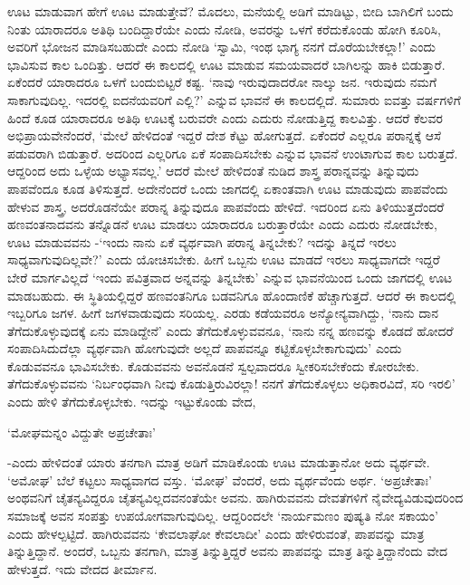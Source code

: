 ಊಟ ಮಾಡುವಾಗ ಹೇಗೆ ಊಟ ಮಾಡುತ್ತೇವೆ? ಮೊದಲು, ಮನೆಯಲ್ಲಿ ಅಡಿಗೆ ಮಾಡಿಟ್ಟು, ಬೀದಿ ಬಾಗಿಲಿಗೆ ಬಂದು ನಿಂತು ಯಾರಾದರೂ ಅತಿಥಿ ಬಂದಿದ್ದಾರೆಯೇ ಎಂದು ನೋಡಿ, ಅವರನ್ನು ಒಳಗೆ ಕರೆದುಕೊಂಡು ಹೋಗಿ ಕೂರಿಸಿ, ಅವರಿಗೆ ಭೋಜನ ಮಾಡಿಸಬಹುದೇ ಎಂದು ನೋಡಿ `ಸ್ವಾಮಿ, ಇಂಥ ಭಾಗ್ಯ ನನಗೆ ದೊರೆಯಬೇಕಲ್ಲಾ!' ಎಂದು ಭಾವಿಸುವ ಕಾಲ ಒಂದಿತ್ತು. ಆದರೆ ಈ ಕಾಲದಲ್ಲಿ ಊಟ ಮಾಡುವ ಸಮಯವಾದರೆ ಬಾಗಿಲನ್ನು ಹಾಕಿ ಬಿಡುತ್ತಾರೆ. ಏಕೆಂದರೆ ಯಾರಾದರೂ ಒಳಗೆ ಬಂದುಬಿಟ್ಟರೆ ಕಷ್ಟ. `ನಾವು ಇರುವುದಾದರೋ ನಾಲ್ಕು ಜನ. ಇರುವುದು ನಮಗೆ ಸಾಕಾಗುವುದಿಲ್ಲ. ಇದರಲ್ಲಿ ಐದನೆಯವರಿಗೆ ಎಲ್ಲಿ?' ಎನ್ನುವ ಭಾವನೆ ಈ ಕಾಲದಲ್ಲಿದೆ. ಸುಮಾರು ಐವತ್ತು ವರ್ಷಗಳಿಗೆ ಹಿಂದೆ ಕೂಡ ಯಾರಾದರೂ ಅತಿಥಿ ಊಟಕ್ಕೆ ಬರುವರೇ ಎಂದು ಎದುರು ನೋಡುತ್ತಿದ್ದ ಕಾಲವಿತ್ತು. ಆದರೆ ಕೆಲವರ ಅಭಿಪ್ರಾಯವೇನೆಂದರೆ, `ಮೇಲೆ ಹೇಳಿದಂತೆ ಇದ್ದರೆ ದೇಶ ಕೆಟ್ಟು ಹೋಗುತ್ತದೆ. ಏಕೆಂದರೆ ಎಲ್ಲರೂ ಪರಾನ್ನಕ್ಕೆ ಆಸೆ ಪಡುವರಾಗಿ ಬಿಡುತ್ತಾರೆ. ಅದರಿಂದ ಎಲ್ಲರಿಗೂ ಏಕೆ ಸಂಪಾದಿಸಬೇಕು ಎನ್ನುವ ಭಾವನೆ ಉಂಟಾಗುವ ಕಾಲ ಬರುತ್ತದೆ. ಆದ್ದರಿಂದ ಅದು ಒಳ್ಳೆಯ ಅಭ್ಯಾಸವಲ್ಲ.' ಆದರೆ ಮೇಲೆ ಹೇಳಿದಂತೆ ನುಡಿದ ಶಾಸ್ತ್ರ ಪರಾನ್ನವನ್ನು ತಿನ್ನುವುದು ಪಾಪವೆಂದೂ ಕೂಡ ತಿಳಿಸುತ್ತದೆ. ಅದೇನೆಂದರೆ ಒಂದು ಜಾಗದಲ್ಲಿ ಏಕಾಂತವಾಗಿ ಊಟ ಮಾಡುವುದು ಪಾಪವೆಂದು ಹೇಳುವ ಶಾಸ್ತ್ರ, ಅದರೊಡನೆಯೇ ಪರಾನ್ನ ತಿನ್ನುವುದೂ ಪಾಪವೆಂದು ಹೇಳಿದೆ. ಇದರಿಂದ ಏನು ತಿಳಿಯುತ್ತದೆಂದರೆ ಹಣವಂತನಾದವನು ತನ್ನೊಡನೆ ಊಟ ಮಾಡಲು ಯಾರಾದರೂ ಬರುತ್ತಾರೆಯೇ ಎಂದು ಎದುರು ನೋಡಬೇಕು, ಊಟ ಮಾಡುವವನು -`ಇಂದು ನಾನು ಏಕೆ ವ್ಯರ್ಥವಾಗಿ ಪರಾನ್ನ ತಿನ್ನಬೇಕು? ಇದನ್ನು ತಿನ್ನದೆ ಇರಲು ಸಾಧ್ಯವಾಗುವುದಿಲ್ಲವೇ?' ಎಂದು ಯೋಚಿಸಬೇಕು. ಹೀಗೆ ಒಬ್ಬನು ಊಟ ಮಾಡದೆ ಇರಲು ಸಾಧ್ಯವಾಗದೇ ಇದ್ದರೆ ಬೇರೆ ಮಾರ್ಗವಿಲ್ಲದೆ `ಇಂದು ಪವಿತ್ರವಾದ ಅನ್ನವನ್ನು ತಿನ್ನಬೇಕು' ಎನ್ನುವ ಭಾವನೆಯಿಂದ ಒಂದು ಜಾಗದಲ್ಲಿ ಊಟ ಮಾಡಬಹುದು. ಈ ಸ್ಥಿತಿಯಲ್ಲಿದ್ದರೆ ಹಣವಂತನಿಗೂ ಬಡವನಿಗೂ ಹೊಂದಾಣಿಕೆ ಹೆಚ್ಚಾಗುತ್ತದೆ. ಆದರೆ ಈ ಕಾಲದಲ್ಲಿ ಇಬ್ಬರಿಗೂ ಜಗಳ. ಹೀಗೆ ಜಗಳವಾಡುವುದು ಸರಿಯಲ್ಲ. ಎರಡು ಕಡೆಯವರೂ ಅನ್ಯೋನ್ಯವಾಗಿದ್ದು, `ನಾನು ದಾನ ತೆಗೆದುಕೊಳ್ಳುವುದಕ್ಕೆ ಏನು ಮಾಡಿದ್ದೇನೆ' ಎಂದು ತೆಗೆದುಕೊಳ್ಳುವವನೂ, `ನಾನು ನನ್ನ ಹಣವನ್ನು ಕೊಡದೆ ಹೋದರೆ ಸಂಪಾದಿಸಿದುದೆಲ್ಲಾ ವ್ಯರ್ಥವಾಗಿ ಹೋಗುವುದೇ ಅಲ್ಲದೆ ಪಾಪವನ್ನೂ ಕಟ್ಟಿಕೊಳ್ಳಬೇಕಾಗುವುದು' ಎಂದು ಕೊಡುವವನೂ ಭಾವಿಸಬೇಕು. ಕೊಡುವವನು ಅವನೊಡನೆ ಸ್ವಲ್ಪವಾದರೂ ಸ್ವೀಕರಿಸಬೇಕೆಂದು ಕೋರಬೇಕು. ತೆಗೆದುಕೊಳ್ಳುವವನು `ನಿರ್ಬಂಧವಾಗಿ ನೀವು ಕೊಡುತ್ತಿರುವಿರಲ್ಲಾ! ನನಗೆ ತೆಗೆದುಕೊಳ್ಳಲು ಅಧಿಕಾರವಿದೆ, ಸರಿ ಇರಲಿ' ಎಂದು ಹೇಳಿ ತೆಗೆದುಕೊಳ್ಳಬೇಕು. ಇದನ್ನು ಇಟ್ಟುಕೊಂಡು ವೇದ,

\begin{shloka}
`ಮೋಘಮನ್ನಂ ವಿದ್ದುತೇ ಅಪ್ರಚೇತಾಃ'
\end{shloka}

-ಎಂದು ಹೇಳಿದಂತೆ ಯಾರು ತನಗಾಗಿ ಮಾತ್ರ ಅಡಿಗೆ ಮಾಡಿಕೊಂಡು ಊಟ ಮಾಡುತ್ತಾನೋ ಅದು ವ್ಯರ್ಥವೇ. `ಅಮೋಘ' ಬೆಲೆ ಕಟ್ಟಲು ಸಾಧ್ಯವಾಗದ ವಸ್ತು. `ಮೋಘ' ವೆಂದರೆ, ಅದು ವ್ಯರ್ಥವೆಂದು ಅರ್ಥ. `ಅಪ್ರಚೇತಾಃ' ಅಂಥವನಿಗೆ ಚೈತನ್ಯವಿದ್ದರೂ ಚೈತನ್ಯವಿಲ್ಲದವನಂತೆಯೇ ಅವನು. ಹಾಗಿರುವವನು ದೇವತೆಗಳಿಗೆ ನೈವೇದ್ಯವಿಡುವುದರಿಂದ ಸಮಾಜಕ್ಕೆ ಅವನ ಸಂಪತ್ತು ಉಪಯೋಗವಾಗುವುದಿಲ್ಲ. ಆದ್ದರಿಂದಲೇ `ನಾರ್ಯಮಣಂ ಪುಷ್ಯತಿ ನೋ ಸಕಾಯಂ' ಎಂದು ಹೇಳಲ್ಪಟ್ಟಿದೆ. ಹಾಗಿರುವವನು `ಕೇವಲಾಘೋ ಕೇವಲಾದೀ' ಎಂದು ಹೇಳಿರುವಂತೆ, ಪಾಪವನ್ನು ಮಾತ್ರ ತಿನ್ನುತ್ತಿದ್ದಾನೆ. ಅಂದರೆ, ಒಬ್ಬನು ತನಗಾಗಿ, ಮಾತ್ರ ತಿನ್ನುತ್ತಿದ್ದರೆ ಅವನು ಪಾಪವನ್ನು ಮಾತ್ರ ತಿನ್ನುತ್ತಿದ್ದಾನೆಂದು ವೇದ ಹೇಳುತ್ತದೆ. ಇದು ವೇದದ ತೀರ್ಮಾನ.

